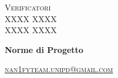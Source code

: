 \documentclass[8pt]{article}
\begin{document}
\begin{titlepage}
\begin{minipage}[t]{0.47\textwidth}
{			
		}
		\vspace{8mm}
		
		{\large{\textsc{Verificatori}}
			\vspace{3mm}
			{\\\large{\textsc{XXXX XXXX}\\}} %
			{\large{\textsc{XXXX XXXX}}}
			
		}
		\vspace{4mm}\vspace{4mm}
	\end{minipage}
	\vspace{4cm}
	\begin{center}
		\begin{flushright}
			{\fontsize{30pt}{52pt}\selectfont \textbf{Norme di Progetto\\}} %
		\end{flushright}
		\vspace{3cm}
	\end{center}
	\vspace{8 cm}
	{\small \textsc{\href{mailto: nan1fyteam.unipd@gmail.com}{nan1fyteam.unipd@gmail.com}}}
\end{titlepage}
\pagestyle{mystyle}
\end{document}
